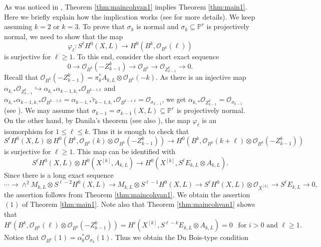 \documentclass{amsart}
\theoremstyle{plain}
\theoremstyle{definition}
\theoremstyle{remark}
\begin{document}
As was noticed in \cite[Remark 5.6]{Choi.Lacini.Park.Sheridan.25}, Theorem \ref{thm:maincohvan1} implies Theorem \ref{thm:main1}. Here we briefly explain how the implication works (see \cite[Section 5]{Choi.Lacini.Park.Sheridan.25} for more details). We keep assuming $k=2$ or $k=3$. To prove that $\sigma_k$ is normal and $\sigma_k \subseteq \mathbb{P}^r$ is projectively normal, we need to show that the map
$$
\varphi_{\ell} \colon S^{\ell} H^0(X, L) \longrightarrow H^0(B^k, \mathcal{O}_{B^k}(\ell))
$$
is surjective for $\ell \geq 1$. To this end, consider the short exact sequence
$$
0 \longrightarrow \mathcal{O}_{B^k}(-Z_{k-1}^k) \longrightarrow \mathcal{O}_{B^k} \longrightarrow \mathcal{O}_{Z_{k-1}^k} \longrightarrow 0. 
$$
Recall that $\mathcal{O}_{B^k}(-Z_{k-1}^k) = \pi_k^* A_{k,L} \otimes \mathcal{O}_{B^k}(-k)$. As there is an injective map $\alpha_{k,*} \mathcal{O}_{Z_{k-1}^k} \hookrightarrow \alpha_{k,*} \alpha_{k-1,k,*} \mathcal{O}_{B^{k-1,k}}$ and $\alpha_{k,*} \alpha_{k-1,k,*} \mathcal{O}_{B^{k-1,k}} = \alpha_{k-1,*} \widetilde{\tau}_{k-1,k,*} \mathcal{O}_{B^{k-1,k}} = \mathcal{O}_{\sigma_{k-1}}$, we get $\alpha_{k,*} \mathcal{O}_{Z_{k-1}^k} = \mathcal{O}_{\sigma_{k-1}}$ (see \cite[Lemma 5.1]{Choi.Lacini.Park.Sheridan.25}). We may assume that $\sigma_{k-1}=\sigma_{k-1}(X, L) \subseteq \mathbb{P}^r$ is projectively normal. On the other hand, by Danila's theorem \cite{Danila.07} (see also \cite[Theorem 2.8]{Choi.Lacini.Park.Sheridan.25}), the map $\varphi_{\ell}$ is an isomorphism for $1 \leq \ell \leq k$. Thus it is enough to check that
$$
S^{\ell} H^0(X, L) \otimes H^0(B^k, \mathcal{O}_{B^k}(k) \otimes \mathcal{O}_{B^k}(-Z_{k-1}^k)) \longrightarrow H^0(B^k, \mathcal{O}_{B^k}(k+\ell) \otimes \mathcal{O}_{B^k}(-Z_{k-1}^k))
$$
is surjective for $\ell \geq 1$. This map can be identified with
$$
S^{\ell} H^0(X, L) \otimes H^0(X^{[k]}, A_{k, L}) \longrightarrow H^0(X^{[k]}, S^{\ell} E_{k,L} \otimes A_{k,L}). 
$$
Since there is a long exact sequence
$$
\cdots \longrightarrow \wedge^2 M_{k,L} \otimes S^{\ell-2} H^0(X, L) \longrightarrow M_{k,L} \otimes S^{\ell-1} H^0(X, L) \longrightarrow S^{\ell} H^0(X, L) \otimes \mathcal{O}_{X^{[k]}} \longrightarrow S^{\ell} E_{k,L} \longrightarrow 0,
$$
the assertion follows from Theorem \ref{thm:maincohvan1}. We obtain the assertion $(1)$ of Theorem \ref{thm:main1}. Note also that Theorem \ref{thm:maincohvan1} shows that
$$
H^i(B^k, \mathcal{O}_{B^k}(\ell) \otimes \mathcal{O}_{B^k}(-Z_{k-1}^k))=H^i(X^{[k]}, S^{\ell-k} E_{k,L} \otimes A_{k,L})=0~~\text{ for $i>0$ and $\ell \geq 1$}. 
$$
Notice that $\mathcal{O}_{B^k}(1) = \alpha_k^* \mathcal{O}_{\sigma_k}(1)$. Thus we obtain the Du Bois-type condition
\end{document}
